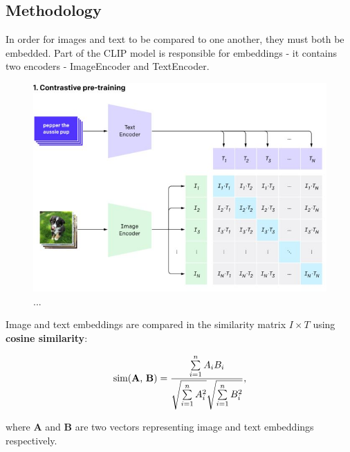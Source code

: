 \documentclass[12pt,a4paper,openany]{book}
\newtheorem{definition}{Definition}
\begin{document}
\subsection{Methodology}
\noindent In order for images and text to be compared to one another, they must both be embedded.  Part of the CLIP model is responsible for embeddings -  it contains two encoders - ImageEncoder and TextEncoder.
 \begin{figure}[ht!]
     \centering
     \includegraphics[scale=0.4]{figs/clip_model_1.jpeg}
     \caption{...}
 \end{figure}
 \newline
\noindent Image and text embeddings are compared in the similarity matrix $I \times T$ using \textbf{cosine similarity}:

\begin{equation}
\text{sim(\textbf{A}, \textbf{B})} = \frac{ \sum\limits_{i=1}^{n}{A_i  B_i} }{ \sqrt{\sum\limits_{i=1}^{n}{A_i^2}}  \sqrt{\sum\limits_{i=1}^{n}{B_i^2}} },
\end{equation}

\noindent where \textbf{A} and \textbf{B} are two vectors representing image and text embeddings respectively.

%
%
%
%
\end{document}
